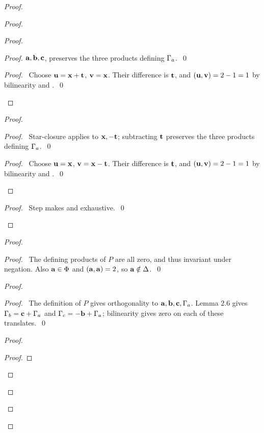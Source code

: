 \begin{proof}
\begin{proof}
\begin{proof}
\begin{proof}
    ${\mathbf a},{\mathbf b},{\mathbf c}$, preserves the three products defining $\Gamma_a$.~\qed
   \end{proof}
   \qedstep
   \begin{proof}
    \pf\ Choose ${\mathbf u}={\mathbf x}+{\mathbf t}$, ${\mathbf v}={\mathbf x}$. Their difference is ${\mathbf t}$, and
    $({\mathbf u},{\mathbf v})=2-1=1$ by bilinearity and .~\qed
   \end{proof}
  \end{proof}
  \begin{proof}
   \begin{proof}
    \pf\ Star-closure applies to ${\mathbf x},-{\mathbf t}$; subtracting ${\mathbf t}$ preserves the
    three products defining $\Gamma_a$.~\qed
   \end{proof}
   \qedstep
   \begin{proof}
    \pf\ Choose ${\mathbf u}={\mathbf x}$, ${\mathbf v}={\mathbf x}-{\mathbf t}$. Their difference is ${\mathbf t}$, and
    $({\mathbf u},{\mathbf v})=2-1=1$ by bilinearity and .~\qed
   \end{proof}
  \end{proof}
  \qedstep
  \begin{proof}\pf\ Step  makes  and  exhaustive.~\qed\end{proof}
 \end{proof}
 \begin{proof}
  \begin{proof}
   \pf\ The defining products of $P$ are all zero, and thus invariant under negation.
   Also ${\mathbf a}\in\Phi$ and $({\mathbf a},{\mathbf a})=2$, so ${\mathbf a}\notin\Delta$.~\qed
  \end{proof}
  \begin{proof}
   \begin{proof}
    \pf\ The definition of $P$ gives orthogonality to ${\mathbf a},{\mathbf b},{\mathbf c},\Gamma_a$.
    Lemma 2.6 gives $\Gamma_b={\mathbf c}+\Gamma_a$ and $\Gamma_c=-{\mathbf b}+\Gamma_a$; bilinearity gives zero
    on each of these translates.~\qed
   \end{proof}
   \begin{proof}
    \begin{proof}

\end{proof}
\end{proof}
\end{proof}
\end{proof}
\end{proof}
